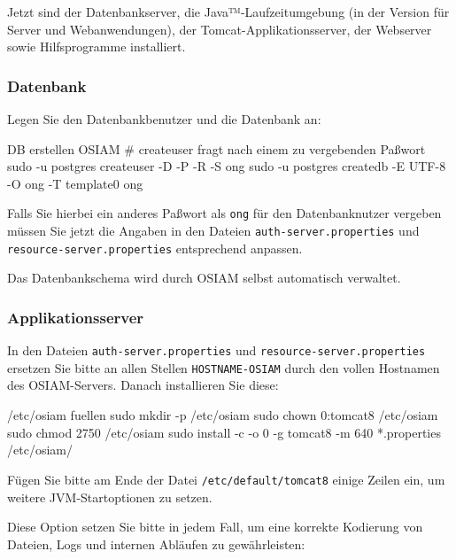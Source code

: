 Jetzt sind der Datenbankserver, die Java™-Laufzeitumgebung (in der
Version für Server und Webanwendungen), der Tomcat-Applikationsserver,
der Webserver sowie Hilfsprogramme installiert.

\subsubsection{Datenbank}\label{subsubsec:setup-osiam-db}

\begin{minipage}{\linewidth}
Legen Sie den Datenbankbenutzer und die Datenbank an:

\begin{lstdump}{DB erstellen OSIAM}
# createuser fragt nach einem zu vergebenden Paßwort
sudo -u postgres createuser -D -P -R -S ong
sudo -u postgres createdb -E UTF-8 -O ong -T template0 ong
\end{lstdump}

Falls Sie hierbei ein anderes Paßwort als \texttt{ong} für
den Datenbanknutzer vergeben müssen Sie jetzt die Angaben
in den Dateien \texttt{auth-server.properties} und
\texttt{resource-server.properties} entsprechend anpassen.
\end{minipage}

Das Datenbankschema wird durch OSIAM selbst automatisch verwaltet.

\subsubsection{Applikationsserver}\label{subsubsec:setup-osiam-tomcat}

\begin{minipage}{\linewidth}
In den Dateien \texttt{auth-server.properties} und
\texttt{resource-server.properties} ersetzen Sie bitte an allen
Stellen \texttt{HOSTNAME-OSIAM} durch den vollen Hostnamen des
OSIAM-Servers. Danach installieren Sie diese:

\begin{lstdump}{/etc/osiam fuellen}
sudo mkdir -p /etc/osiam
sudo chown 0:tomcat8 /etc/osiam
sudo chmod 2750 /etc/osiam
sudo install -c -o 0 -g tomcat8 -m 640 *.properties /etc/osiam/
\end{lstdump}
\end{minipage}

Fügen Sie bitte am Ende der Datei \texttt{/etc/default/tomcat8}
einige Zeilen ein, um weitere JVM-Startoptionen zu setzen.

\begin{minipage}{\linewidth}
Diese Option setzen Sie bitte in jedem Fall, um eine korrekte
Kodierung von Dateien, Logs und internen Abläufen zu gewährleisten:

\end{minipage}

